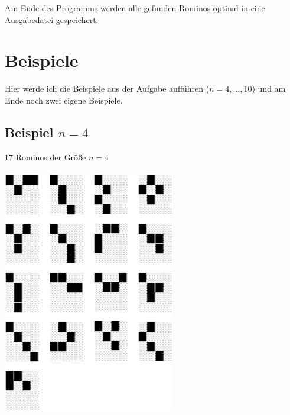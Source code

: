 \documentclass[a4paper,10pt]{scrartcl}
\begin{document}
Am Ende des Programms werden alle gefunden Rominos optinal in eine Ausgabedatei gespeichert.
\pagebreak

\section{Beispiele}
Hier werde ich die Beispiele aus der Aufgabe aufführen (\(n=4,...,10\)) und am Ende noch zwei eigene Beispiele.

\subsection{Beispiel \(n=4\)}
17 Rominos der Größe \(n=4\) \\\\
\includegraphics{4.jpg}
\pagebreak
\end{document}
